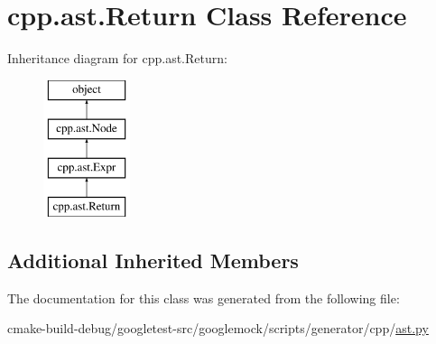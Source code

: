 \hypertarget{classcpp_1_1ast_1_1Return}{}\section{cpp.\+ast.\+Return Class Reference}
\label{classcpp_1_1ast_1_1Return}
Inheritance diagram for cpp.\+ast.\+Return\+:\begin{figure}[H]
\begin{center}
\leavevmode
\includegraphics[height=4.000000cm]{classcpp_1_1ast_1_1Return}
\end{center}
\end{figure}
\subsection*{Additional Inherited Members}


The documentation for this class was generated from the following file\+:\begin{DoxyCompactItemize}
\item 
cmake-\/build-\/debug/googletest-\/src/googlemock/scripts/generator/cpp/\mbox{\hyperlink{ast_8py}{ast.\+py}}\end{DoxyCompactItemize}
